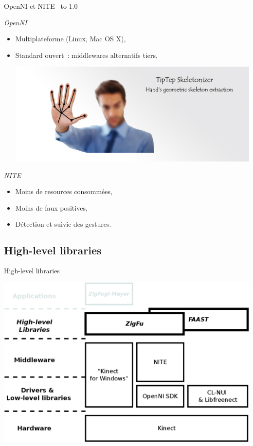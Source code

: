 \begin{frame}{OpenNI et NITE~\cite{microsoft_vs_openni}}
\vbox to 1.0\textheight
{
  \emph{OpenNI}
  \begin{itemize}
    \item<1-> Multiplateforme (Linux, Mac OS X),
    \item<2-> Standard ouvert~: middlewares alternatifs tiers,
    {
      \vfill
      \begin{center}
      \includegraphics[width=0.8\linewidth]{../images/tiptep}
      \end{center}
    }
  \end{itemize}
  
  {
  \emph{NITE}
  \begin{itemize}
    \item<3-> Moins de resources consommées,
    \item<4-> Moins de faux positives,
    \item<5-> Détection et suivie des \og{}gestures\fg{}.
  \end{itemize}
  }
\vfill
}
\end{frame}

\subsection{High-level libraries}
\begin{frame}{High-level libraries}
\begin{center}
\includegraphics[width=0.9\linewidth]{../images/technology_overview_3}
\end{center}
\end{frame}

